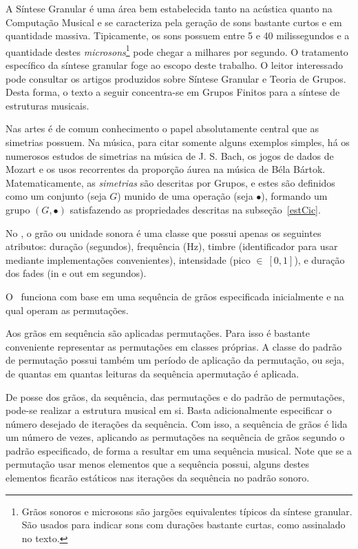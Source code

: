 A Síntese Granular é uma área bem estabelecida tanto na acústica quanto
na Computação Musical e se caracteriza pela geração de sons bastante curtos
e em quantidade massiva. Tipicamente, os sons possuem entre 5 e 40 milissegundos
e a quantidade destes \emph{microsons}\footnote{Grãos sonoros e microsons são jargões equivalentes
típicos da síntese granular. São usados para indicar sons com durações
bastante curtas, como assinalado no texto.} pode chegar a milhares por segundo. O tratamento específico da
síntese granular foge ao escopo deste trabalho. O leitor interessado pode consultar os artigos produzidos sobre Síntese Granular e Teoria de Grupos.\cite{figgusOriginal,figgusEspacializacao}
Desta forma, o texto a seguir concentra-se em Grupos Finitos para a síntese de estruturas musicais.

Nas artes é de comum conhecimento o papel absolutamente central
que as simetrias possuem. Na música, para citar somente alguns exemplos simples,
há os numerosos estudos de simetrias na música de J. S. Bach, os jogos
de dados de Mozart e os usos recorrentes da proporção áurea na música
de Béla Bártok. Matematicamente, as \emph{simetrias} são descritas por Grupos,
e estes são definidos como um conjunto (seja $G$)
munido de uma operação (seja $\bullet$), formando um grupo $(G,\bullet)$
satisfazendo as propriedades descritas na subseção~\ref{estCic}.

No \figgus, o grão ou unidade sonora
é uma classe que possui apenas
os seguintes atributos: duração (segundos),
frequência (Hz), timbre (identificador para usar mediante implementações convenientes), intensidade (pico $\in \ [0,1]$), e duração dos fades (in e out em segundos).


O \figgus\ funciona com base em uma sequência de grãos especificada inicialmente e na qual operam as permutações.


Aos grãos em sequência são aplicadas permutações.
Para isso é bastante conveniente representar as permutações em classes próprias.
A classe do padrão de permutação possui também um período de aplicação da permutação, ou seja, de quantas em quantas leituras da sequência apermutação é aplicada.


De posse dos grãos, da sequência, das permutações e do padrão de permutações, pode-se realizar a estrutura musical em si. Basta adicionalmente especificar o número desejado de iterações da sequência. Com isso, a sequência de grãos é lida um número de vezes, aplicando as permutações na sequência de grãos segundo o padrão especificado, de forma a resultar em uma sequência musical. Note que se a permutação usar menos elementos que a sequência possui, alguns destes elementos ficarão estáticos nas iterações da sequência no padrão sonoro.

